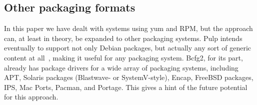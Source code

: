 \subsection{Other packaging formats}

In this paper we have dealt with systems using yum and RPM, but the
approach can, at least in theory, be expanded to other packaging
systems.  Pulp intends eventually to support not only Debian packages,
but actually any sort of generic content at all~\cite{Dob11-3}, making
it useful for any packaging system.  Bcfg2, for its part, already has
package drivers for a wide array of packaging systems, including APT,
Solaris packages (Blastwave- or SystemV-style), Encap, FreeBSD
packages, IPS, Mac Ports, Pacman, and Portage.  This gives a hint of
the future potential for this approach.
